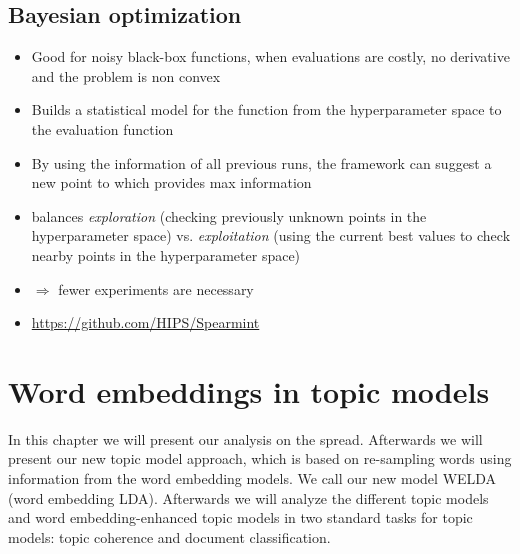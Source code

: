 \documentclass[
        a4paper,
        titlepage,
        twoside,
        parskip
        ]{scrbook}
\theoremstyle{break}
\begin{document}
%
%
%
%
%
%
%

\section{Bayesian optimization}
\begin{itemize}
  \item Good for noisy black-box functions, when evaluations are costly, no derivative and the problem is non convex
  \item Builds a statistical model for the function from the hyperparameter space to the evaluation function
  \item By using the information of all previous runs, the framework can suggest a new point to which provides max information
  \item balances \emph{exploration} (checking previously unknown points in the hyperparameter space) vs. \emph{exploitation} (using the current best values to check nearby points in the hyperparameter space)
  \item $\Rightarrow$ fewer experiments are necessary
  \item \url{https://github.com/HIPS/Spearmint}
\end{itemize}


\chapter{Word embeddings in topic models}

In this chapter we will present our analysis on the spread.
Afterwards we will present our new topic model approach, which is based on re-sampling words using information from the word embedding models.
We call our new model WELDA (word embedding LDA).
Afterwards we will analyze the different topic models and word embedding-enhanced topic models in two standard tasks for topic models: topic coherence and document classification.
\end{document}
